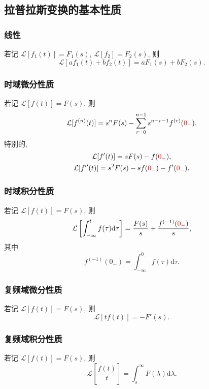 \subsection{拉普拉斯变换的基本性质} \label{4 拉普拉斯变换的基本性质}
\subsubsection{线性}
若记 $\mathcal{L}[f_1(t)]=F_1(s)$, $\mathcal{L}[f_2]=F_2(s)$, 则
\begin{equation}
    \mathcal{L}[af_1(t)+bf_2(t)]=aF_1(s)+bF_2(s).
\end{equation}

\subsubsection{时域微分性质}
若记 $\mathcal{L}[f(t)]=F(s)$, 则
\begin{equation} \label{eq:4.2 diff t}
    \mathcal{L}[f^{(n)}(t)]=s^nF(s)-\sum_{r=0}^{n-1}s^{n-r-1}f^{(r)}({\color{red} 0_-}).
\end{equation}
特别的,
\begin{gather}
    \mathcal{L}[f'(t)]=sF(s)-f({\color{red} 0_-}), \\
    \mathcal{L}[f''(t)]=s^2F(s)-sf({\color{red} 0_-})-f'({\color{red} 0_-}).
\end{gather}

\subsubsection{时域积分性质}
若记 $\mathcal{L}[f(t)]=F(s)$, 则
\begin{equation}
    \mathcal{L}\left[\int_{-\infty}^{t}f(\tau)\mathrm{d}\tau\right]=\frac{F(s)}{s}+\frac{f^{(-1)}({\color{red} 0_-})}{s},
\end{equation}
其中
\begin{equation*}
    f^{(-1)}(0_-)=\int_{-\infty}^{0_-}f(\tau)\mathrm{d}\tau.
\end{equation*}

\subsubsection{复频域微分性质}
若记 $\mathcal{L}[f(t)]=F(s)$, 则
\begin{equation}
    \mathcal{L}[tf(t)]=-F'(s).
\end{equation}

\subsubsection{复频域积分性质}
若记 $\mathcal{L}[f(t)]=F(s)$, 则
\begin{equation}
    \mathcal{L}\left[\frac{f(t)}{t}\right]=\int_{s}^{\infty}F(\lambda)\mathrm{d}\lambda.
\end{equation}

